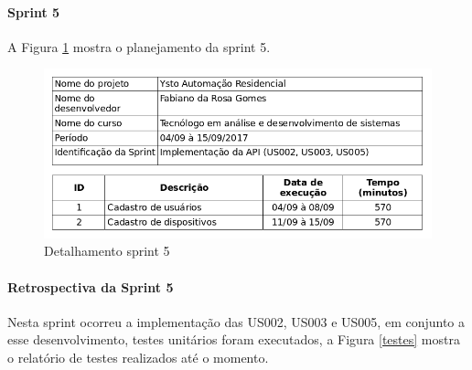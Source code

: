\paragraph{Sprint 5} A Figura \ref{sprint-5} mostra o planejamento da sprint 5.

\begin{figure}[H]
\caption{\label{sprint-5} Detalhamento sprint 5}
\includegraphics[scale=0.5]{img/sprint-5.png}
\end{figure}

\paragraph{Retrospectiva da Sprint 5} Nesta sprint ocorreu a implementação das US002, US003 e US005, em conjunto a esse desenvolvimento, testes unitários foram executados, a Figura \ref{testes} mostra o relatório de testes realizados até o momento.

